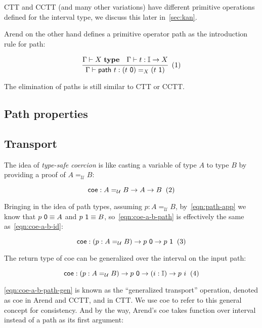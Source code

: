 CTT and CCTT (and many other variations) have different primitive
operations defined for the interval type,
we discuss this later in~\cref{sec:kan}.

Arend on the other hand defines a primitive operator \textsf{path}
as the introduction rule for path:

\[
  \cfrac{
    \Gamma \vdash X \ \textbf{type}
    \quad
    \Gamma \vdash t : \mathbb I \rightarrow X
  }{
    \Gamma \vdash \textsf{path} \ t : (t \ \textsf 0) =_X (t \ \textsf 1)
  }
  \xtag
\]

The elimination of paths is still similar to CTT or CCTT.

\subsection{Path properties}
\label{subsec:path-prop}


\subsection{Transport}
\label{subsec:coe}

The idea of \textit{type-safe coercion} is like
casting a variable of type $A$ to type $B$ by providing a proof
of $A =_{\mathcal U} B$:

\[
  \textsf{coe} : A =_{\mathcal U} B \rightarrow A \rightarrow B
  \xtag \label{eqn:coe-a-b-id}
\]

Bringing in the idea of path types,
assuming $p : A =_{\mathcal U} B$, by~\ref{eqn:path-app}
we know that $p \ \textsf 0 \equiv A$ and
$p \ \textsf 1 \equiv B$,
so~\ref{eqn:coe-a-b-path} is effectively the same
as~\ref{eqn:coe-a-b-id}:

\[
  \textsf{coe} : (p : A =_{\mathcal U} B) \rightarrow p \ \textsf 0
  \rightarrow p \ \textsf 1
  \xtag \label{eqn:coe-a-b-path}
\]

The return type of \textsf{coe} can be generalized over
the interval on the input path:

\[
  \textsf{coe} : (p : A =_{\mathcal U} B) \rightarrow p \ \textsf 0
  \rightarrow (i : \mathbb I) \rightarrow p \ i
  \xtag \label{eqn:coe-a-b-path-gen}
\]

\ref{eqn:coe-a-b-path-gen} is known as the ``generalized transport''
operation, denoted as \textsf{coe} in Arend and CCTT,
and  in CTT.
We use \textsf{coe} to refer to this general concept for consistency.
And by the way,
Arend's \textsf{coe} takes function over interval instead
of a path as its first argument:

